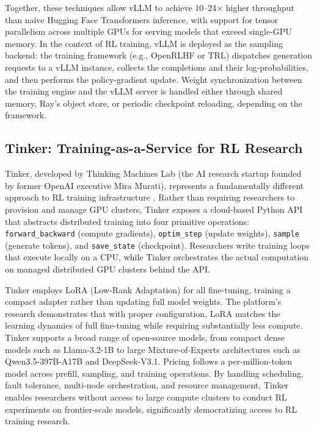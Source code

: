 Together, these techniques allow vLLM to achieve 10--24$\times$ higher throughput than naive Hugging Face Transformers inference, with support for tensor parallelism across multiple GPUs for serving models that exceed single-GPU memory. In the context of RL training, vLLM is deployed as the sampling backend: the training framework (e.g., OpenRLHF or TRL) dispatches generation requests to a vLLM instance, collects the completions and their log-probabilities, and then performs the policy-gradient update. Weight synchronization between the training engine and the vLLM server is handled either through shared memory, Ray's object store, or periodic checkpoint reloading, depending on the framework.

\subsection{Tinker: Training-as-a-Service for RL Research}

Tinker, developed by Thinking Machines Lab (the AI research startup founded by former OpenAI executive Mira Murati), represents a fundamentally different approach to RL training infrastructure \cite{tinker2025}. Rather than requiring researchers to provision and manage GPU clusters, Tinker exposes a cloud-based Python API that abstracts distributed training into four primitive operations: \texttt{forward\_backward} (compute gradients), \texttt{optim\_step} (update weights), \texttt{sample} (generate tokens), and \texttt{save\_state} (checkpoint). Researchers write training loops that execute locally on a CPU, while Tinker orchestrates the actual computation on managed distributed GPU clusters behind the API.

Tinker employs LoRA (Low-Rank Adaptation) for all fine-tuning, training a compact adapter rather than updating full model weights. The platform's research demonstrates that with proper configuration, LoRA matches the learning dynamics of full fine-tuning while requiring substantially less compute. Tinker supports a broad range of open-source models, from compact dense models such as Llama-3.2-1B to large Mixture-of-Experts architectures such as Qwen3.5-397B-A17B and DeepSeek-V3.1. Pricing follows a per-million-token model across prefill, sampling, and training operations. By handling scheduling, fault tolerance, multi-node orchestration, and resource management, Tinker enables researchers without access to large compute clusters to conduct RL experiments on frontier-scale models, significantly democratizing access to RL training research.

